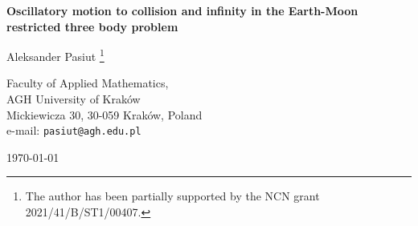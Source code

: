 \documentclass[1p]{article}
\begin{document}
\def\stablemanifold#1#2#3#4#5{\begin{scope}[thick,decoration={
    markings,
    mark=at position #4 with {\arrow{Latex[length=3mm]}},
    mark=at position #5 with {\arrowreversed{Latex[length=3mm]}}}
    ] 
    \draw[#3, postaction={decorate}] #1 -- #2;
\end{scope}}

\def\unstablemanifold#1#2#3#4#5{\begin{scope}[thick,decoration={
    markings,
    mark=at position #4 with {\arrowreversed{Latex[length=3mm]}},
    mark=at position #5 with {\arrow{Latex[length=3mm]}}}
    ] 
    \draw[#3, postaction={decorate}] #1 -- #2;
\end{scope}}

\def\stablemanifoldpositive#1#2#3#4#5{\begin{scope}[thick,decoration={
    markings,
    mark=at position #5 with {\arrowreversed{Latex[length=3mm]}}}
    ] 
    \draw[#3, postaction={decorate}] #1 -- #2;
\end{scope}}

\def\unstablemanifoldpositive#1#2#3#4#5{\begin{scope}[thick,decoration={
    markings,
    mark=at position #5 with {\arrow{Latex[length=3mm]}}}
    ] 
    \draw[#3, postaction={decorate}] #1 -- #2;
\end{scope}}

\def\hset#1#2#3#4#5{
    \draw[double=#5, thick, double distance=2pt] #1 -- #2;
    \draw[double=#5, thick, double distance=2pt] #3 -- #4;
    \draw[thick] #2 -- #3;
    \draw[thick] #1 -- #4;
}

\def\hsetrect#1#2#3#4#5{
    \hset{(#1,#3)}{(#1,#4)}{(#2,#4)}{(#2,#3)}{#5}
}

\def\hsetparallelogram#1#2#3#4#5{
    \hset
        {(#1*5/6-#3*1/6,#3*5/6-#1*1/6)}
        {(#1*5/6-#4*1/6,#4*5/6-#1*1/6)}
        {(#2*5/6-#4*1/6,#4*5/6-#2*1/6)}
        {(#2*5/6-#3*1/6,#3*5/6-#2*1/6)}{#5}
}


\begin{center}
{\Large \bf Oscillatory motion to collision and infinity in the Earth-Moon restricted three body problem}

 \vskip 0.5cm
{\large Aleksander Pasiut \footnote{The author has been partially supported by the NCN grant 2021/41/B/ST1/00407.}}

 \vskip 0.2cm
 { Faculty of Applied Mathematics,\\
 AGH University of Kraków}\\
{\small  Mickiewicza 30, 30-059 Krak\'ow, Poland} \\
e-mail: \texttt{pasiut@agh.edu.pl}

\vskip 0.5cm

 \today
\vskip 0.5cm

\end{center}
\end{document}
